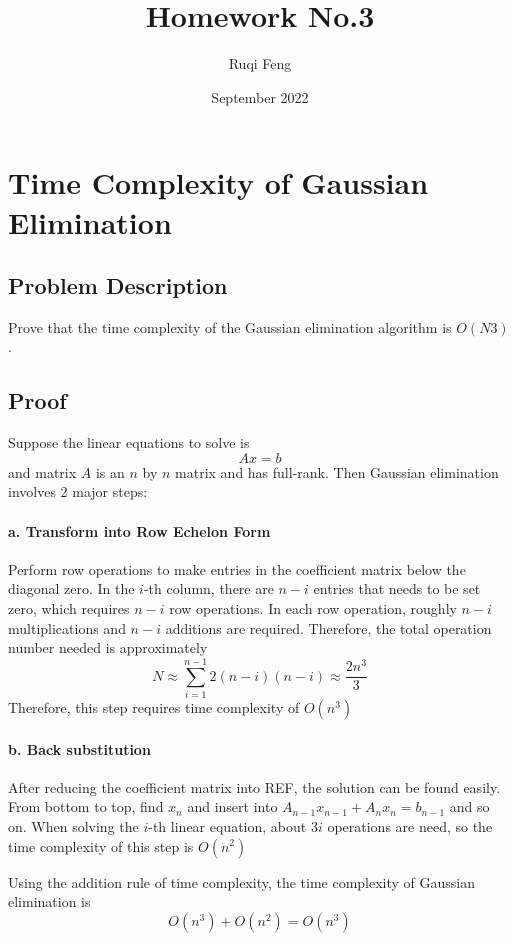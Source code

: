 \documentclass{article}
\title{Homework No.3}
\author{Ruqi Feng}
\date{September 2022}
\begin{document}
\maketitle

\section{Time Complexity of Gaussian Elimination}
\subsection{Problem Description}
Prove that the time complexity of the Gaussian elimination algorithm is $O(N3)$.
\subsection{Proof}
Suppose the linear equations to solve is
\begin{equation}
    Ax = b
\end{equation}
and matrix $A$ is an $n$ by $n$ matrix and has full-rank.
Then Gaussian elimination involves 2 major steps:
\paragraph{a. Transform into Row Echelon Form}
Perform row operations to make entries in the coefficient matrix below the diagonal zero. In the $i$-th column, there are $n-i$ entries that needs to be set zero, which requires $n - i$ row operations. In each row operation, roughly $n - i$ multiplications and $n - i$ additions are required. Therefore, the total operation number needed is approximately
\begin{equation}
    N\approx\sum_{i=1}^{n-1} 2(n-i)(n - i) \approx \frac{2n^3}{3}
\end{equation}
Therefore, this step requires time complexity of $O(n^3)$
\paragraph{b. Back substitution}
After reducing the coefficient matrix into REF, the solution can be found easily.
From bottom to top, find $x_n$ and insert into $A_{n-1}x_{n-1} + A_{n}x_n=b_{n-1}$ and so on. When solving the $i$-th linear equation, about $3i$ operations are need, so the time complexity of this step is $O(n^2)$
\par\quad\par
Using the addition rule of time complexity, the time complexity of Gaussian elimination is 
\begin{equation}
    O(n^3)+O(n^2)=O(n^3)    
\end{equation}
\end{document}
